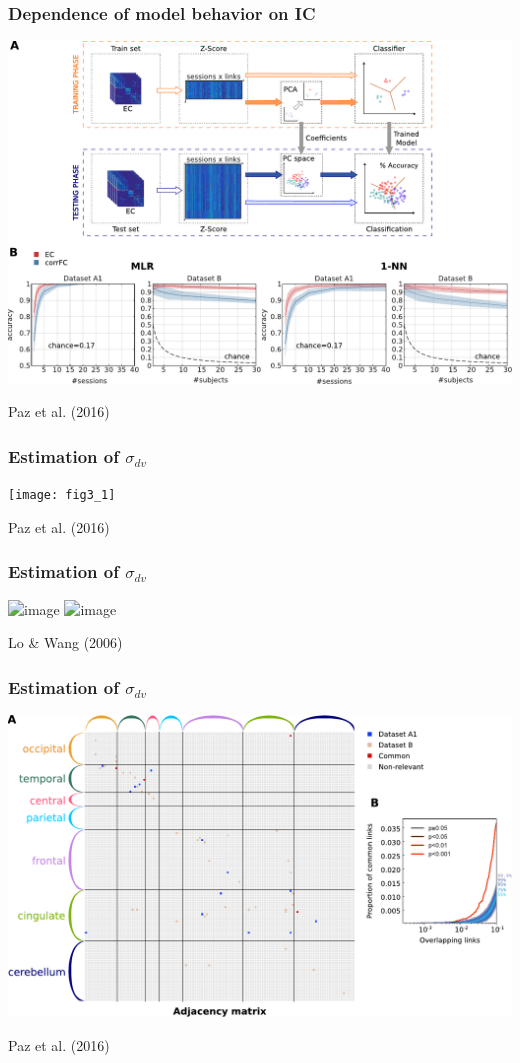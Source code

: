 \documentclass[final]{beamer}
\begin{document}
\begin{frame}
\frametitle{Dependence of model behavior on IC}
\begin{center}
\includegraphics[width=0.8\columnwidth]{fig2}
\end{center}
\vspace{1cm}
\tiny{Paz et al. (2016)}
\end{frame}

\begin{frame}
\frametitle{Estimation of $\sigma_{dv}$}
\pause
\begin{center}
\texttt{[image: fig3\_1]}
\end{center}
\vspace{1cm}
\tiny{Paz et al. (2016)}
\end{frame}

\begin{frame}
\frametitle{Estimation of $\sigma_{dv}$}
\begin{center}
\includegraphics<1>[width=0.6\columnwidth]{threshold}
\transdissolve
\includegraphics<2>[width=0.8\columnwidth]{full_model}
\end{center}
\vspace{1cm}
\tiny{Lo \& Wang (2006)}
\end{frame}

\begin{frame}
\frametitle{Estimation of $\sigma_{dv}$}
\begin{center}
\includegraphics[width=0.8\columnwidth]{fig3}
\end{center}
\vspace{1cm}
\tiny{Paz et al. (2016)}
\end{frame}
\end{document}
